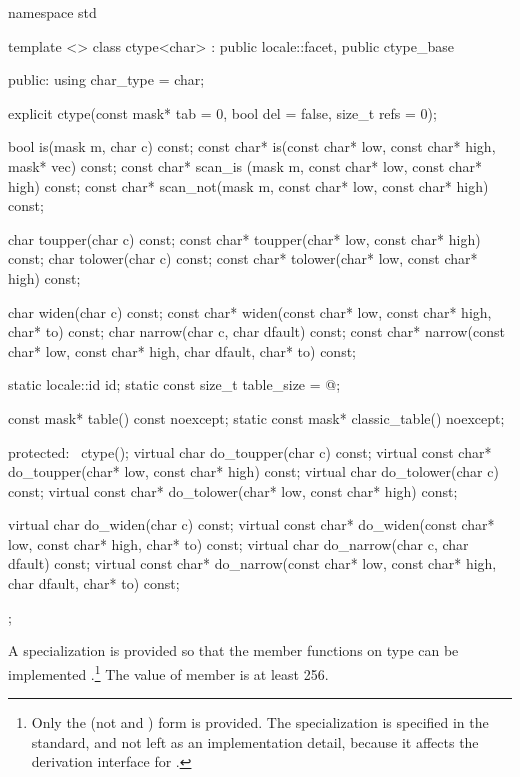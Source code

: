 %
\begin{codeblock}
namespace std {
  template <> class ctype<char>
    : public locale::facet, public ctype_base {
  public:
    using char_type = char;

    explicit ctype(const mask* tab = 0, bool del = false,
                   size_t refs = 0);

    bool is(mask m, char c) const;
    const char* is(const char* low, const char* high, mask* vec) const;
    const char* scan_is (mask m,
                         const char* low, const char* high) const;
    const char* scan_not(mask m,
                         const char* low, const char* high) const;

    char        toupper(char c) const;
    const char* toupper(char* low, const char* high) const;
    char        tolower(char c) const;
    const char* tolower(char* low, const char* high) const;

    char  widen(char c) const;
    const char* widen(const char* low, const char* high, char* to) const;
    char  narrow(char c, char dfault) const;
    const char* narrow(const char* low, const char* high, char dfault,
                       char* to) const;

    static locale::id id;
    static const size_t table_size = @\impdef@;

    const mask* table() const noexcept;
    static const mask* classic_table() noexcept;

  protected:
   ~ctype();
    virtual char        do_toupper(char c) const;
    virtual const char* do_toupper(char* low, const char* high) const;
    virtual char        do_tolower(char c) const;
    virtual const char* do_tolower(char* low, const char* high) const;

    virtual char        do_widen(char c) const;
    virtual const char* do_widen(const char* low,
                                 const char* high,
                                 char* to) const;
    virtual char        do_narrow(char c, char dfault) const;
    virtual const char* do_narrow(const char* low,
                                  const char* high,
                                  char dfault, char* to) const;
  };
}
\end{codeblock}

\pnum
A specialization
is provided so that the member functions on type
can be implemented
.\footnote{Only the
(not
and
)
form is provided.
The specialization is specified in the standard, and not left as an
implementation detail, because it affects the derivation interface for
.}
The  value of member
is at least 256.

